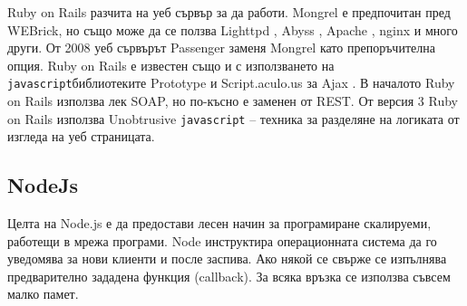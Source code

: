 \documentclass[a4paper]{article}
\def\js{\texttt{javascript}}
\begin{document}
  Ruby on Rails разчита на уеб сървър за да работи. Mongrel е предпочитан пред WEBrick, но също може да се ползва Lighttpd \cite{lighttpd}, Abyss \cite{abyss}, Apache \cite{apache}, nginx \cite{nginx} и много други. От 2008 уеб сървърът Passenger \cite{passenger} заменя Mongrel като препоръчителна опция.
  Ruby on Rails е известен също и с използването на \js библиотеките Prototype \cite{prototype} и Script.aculo.us за Ajax \cite{ajax}. В началото Ruby on Rails използва лек SOAP, но по-късно е заменен от REST. От версия 3 Ruby on Rails използва Unobtrusive \js \cite{unobtrusive} -- техника за разделяне на логиката от изгледа на уеб страницата.
  \subsection{NodeJs}
  Целта на Node.js \cite{node} е да предостави лесен начин за програмиране скалируеми, работещи в мрежа програми. Node инструктира операционната система да го уведомява за нови клиенти и после заспива. Ако някой се свърже се изпълнява предварително зададена функция (callback). За всяка връзка се използва съвсем малко памет.
\end{document}
